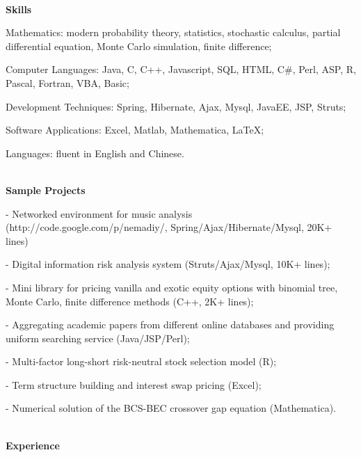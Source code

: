 \documentclass[9.5pt]{article}
\begin{document}
\hrulefill\\
\vspace{0.12in}
{\large \textbf{Skills}}

\begin{description*}
\item[Mathematics:]
modern probability theory, statistics, stochastic calculus, partial differential equation, Monte Carlo simulation,  finite difference;  
\item[Computer Languages:]
 Java, C, C++,  Javascript, SQL, HTML, C\#, Perl,   ASP,  R, Pascal,  Fortran, VBA, Basic;
 \item[Development Techniques:]
Spring, Hibernate, Ajax, Mysql, JavaEE,  JSP, Struts;
\item[Software Applications:]
Excel,  Matlab, Mathematica, \LaTeX;
\item[Languages:]
fluent in English and Chinese.

\end{description*}
\hrulefill\\
\vspace{0.12in}
{\large \textbf{Sample Projects}}

\begin{itemize*}
\item[-] Networked environment for music analysis ({http://code.google.com/p/nemadiy/}, Spring/Ajax/Hibernate/Mysql, 20K+ lines)
\item[-] Digital information risk analysis system (Struts/Ajax/Mysql, 10K+ lines);
\item[-] Mini library for pricing vanilla and exotic equity options with binomial tree, Monte Carlo, finite difference methods (C++, 2K+ lines);
\item[-] Aggregating academic papers from different online databases and providing uniform searching service (Java/JSP/Perl);
\item[-] Multi-factor long-short risk-neutral stock selection model (R);
\item[-] Term structure building and interest swap pricing (Excel); 
\item[-] Numerical solution of the BCS-BEC crossover gap equation (Mathematica).
\end{itemize*}
\hrulefill\\
\vspace{0.12in}
{\large \textbf{Experience}}
\end{document}

